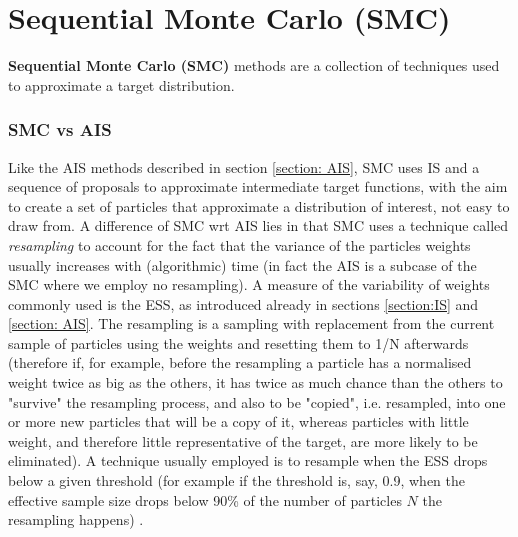 \documentclass[12pt,mythesisstyle]{report}
\begin{document}
\section{Sequential Monte Carlo (SMC)}\label{section: SMC}
\textbf{Sequential Monte Carlo (SMC)} methods are a collection of techniques used to approximate a target distribution.
\subsubsection{SMC vs AIS}
Like the AIS methods described in section \ref{section: AIS}, SMC uses IS and a sequence of proposals to approximate intermediate target functions, with the aim to create a set of particles that approximate a distribution of interest, not easy to draw from. A difference of SMC wrt AIS lies in that SMC uses a technique called \textit{resampling} to account for the fact that the variance of the particles weights usually increases with (algorithmic) time (in fact the AIS is a subcase of the SMC where we employ no resampling). A measure of the variability of weights commonly used is the ESS, as introduced already in sections \ref{section:IS} and \ref{section: AIS}. The resampling is a sampling with replacement from the current sample of particles using the weights and resetting them to 1/N afterwards (therefore if, for example, before the resampling a particle has a normalised weight twice as big as the others, it has twice as much chance than the others to "survive" the resampling process, and also to be "copied", i.e. resampled, into one or more new particles that will be a copy of it, whereas particles with little weight, and therefore little representative of the target, are more likely to be eliminated). A technique usually employed is to resample when the ESS drops below a given threshold (for example if the threshold is, say, 0.9, when the effective sample size drops below 90\% of the number of particles $N$ the resampling happens) \cite{sequentialmcsamplersdelmoral} \cite{crisan1}.
\end{document}
